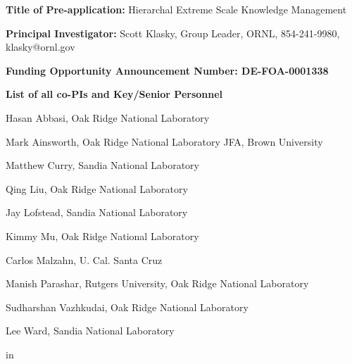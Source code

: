 \documentclass[11pt,letterpaper]{article}
\begin{document}

% 









%

{\bf Title of Pre-application:} Hierarchal Extreme Scale Knowledge Management \par
{\bf Principal Investigator:} Scott Klasky, Group Leader, ORNL, 854-241-9980, klasky@ornl.gov \par
{\bf Funding Opportunity Announcement Number: DE-FOA-0001338} \par
{\bf List of all co-PIs and Key/Senior Personnel} \par
Hasan Abbasi, Oak Ridge National Laboratory \par
Mark Ainsworth, Oak Ridge National Laboratory JFA, Brown University \par
Matthew Curry, Sandia National Laboratory\par
Qing Liu, Oak Ridge National Laboratory \par
Jay Lofstead, Sandia National Laboratory \par
Kimmy Mu, Oak Ridge National Laboratory \par
Carlos Malzahn, U. Cal. Santa Cruz \par
Manish Parashar, Rutgers University, Oak Ridge National Laboratory \par
 Sudharshan Vazhkudai, Oak Ridge National Laboratory \par
Lee Ward, Sandia National Laboratory \par
{} in
\end{document}
